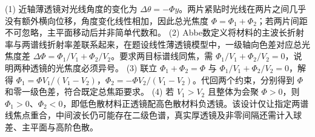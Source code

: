 (1) 近轴薄透镜对光线角度的变化为 \(\Delta\theta=-\Phi y\)。两片紧贴时光线在两片之间几乎没有额外横向位移，角度变化线性相加，因此总光焦度 \(\Phi=\Phi_1+\Phi_2\)；若两片间距不可忽略，主平面移动后并非简单代数和。
(2) Abbe数定义将材料的主波长折射率与两谱线折射率差联系起来，在题设线性薄透镜模型中，一级轴向色差对应总光焦度差 \(\Delta\Phi=\Phi_1/V_1+\Phi_2/V_2\)。要求两目标谱线同焦，需 \(\Phi_1/V_1+\Phi_2/V_2=0\)，说明两种透镜的光焦度必须异号。
(3) 联立 \(\Phi_1+\Phi_2=\Phi\) 与 \(\Phi_1/V_1+\Phi_2/V_2=0\)，解得 \(\Phi_1=\Phi V_1/(V_1-V_2)\)，\(\Phi_2=-\Phi V_2/(V_1-V_2)\)。代回两个约束，分别得到 \(\Phi\) 和零一级色差，符合既定总焦距要求。
(4) 若 \(V_1>V_2\) 且整体为会聚 \(\Phi>0\)，则 \(\Phi_1>0\)、\(\Phi_2<0\)，即低色散材料正透镜配高色散材料负透镜。该设计仅让指定两谱线焦点重合，中间波长仍可能存在二级色谱，真实厚透镜及非零间隔还需计入球差、主平面与高阶色散。
